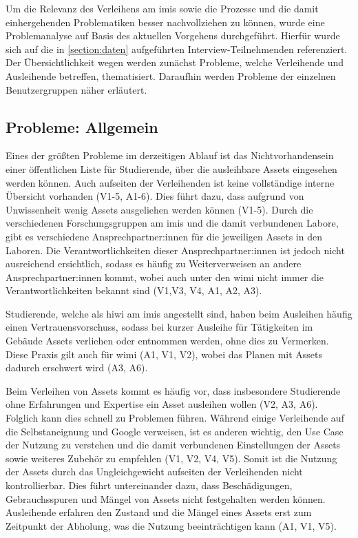 Um die Relevanz des Verleihens am \ac{imis} sowie die Prozesse und die damit einhergehenden
Problematiken besser nachvollziehen zu können, wurde eine Problemanalyse auf Basis des aktuellen
Vorgehens durchgeführt. Hierfür wurde sich auf die in \ref{section:daten} aufgeführten
Interview-Teilnehmenden referenziert. Der Übersichtlichkeit wegen werden zunächst Probleme,
welche Verleihende und Ausleihende betreffen, thematisiert. Daraufhin werden Probleme der einzelnen
Benutzergruppen näher erläutert.

\subsection{Probleme: Allgemein}
\label{section:probleme-allgemein}
Eines der größten Probleme im derzeitigen Ablauf ist das Nichtvorhandensein einer öffentlichen Liste
für Studierende, über die ausleihbare Assets eingesehen werden können. Auch aufseiten der
Verleihenden ist keine vollständige interne Übersicht vorhanden (V1-5, A1-6). Dies führt dazu, dass
aufgrund von Unwissenheit wenig Assets ausgeliehen werden können (V1-5). Durch die verschiedenen
Forschungsgruppen am \ac{imis} und die damit verbundenen Labore, gibt es verschiedene
Ansprechpartner:innen für die jeweiligen Assets in den Laboren. Die Verantwortlichkeiten dieser
Ansprechpartner:innen ist jedoch nicht ausreichend ersichtlich, sodass es häufig zu Weiterverweisen
an andere Ansprechpartner:innen kommt, wobei auch unter den \ac{wimi} nicht immer
die Verantwortlichkeiten bekannt sind (V1,V3, V4, A1, A2, A3).

Studierende, welche als \ac{hiwi} am \ac{imis} angestellt sind, haben beim Ausleihen häufig einen
Vertrauensvorschuss, sodass bei kurzer Ausleihe für Tätigkeiten im Gebäude Assets verliehen oder
entnommen werden, ohne dies zu Vermerken. Diese Praxis gilt auch für \ac{wimi} (A1, V1, V2), wobei
das Planen mit Assets dadurch erschwert wird (A3, A6).

Beim Verleihen von Assets kommt es häufig vor, dass insbesondere Studierende ohne Erfahrungen und
Expertise ein Asset ausleihen wollen (V2, A3, A6). Folglich kann dies schnell zu Problemen führen.
Während einige Verleihende auf die Selbstaneignung und Google verweisen, ist es anderen wichtig, den
Use Case der Nutzung zu verstehen und die damit verbundenen Einstellungen der Assets sowie weiteres
Zubehör zu empfehlen (V1, V2, V4, V5). Somit ist die Nutzung der Assets durch das Ungleichgewicht
aufseiten der Verleihenden nicht kontrollierbar. Dies führt untereinander dazu, dass Beschädigungen,
Gebrauchsspuren und Mängel von Assets nicht festgehalten werden können. Ausleihende erfahren den
Zustand und die Mängel eines Assets erst zum Zeitpunkt der Abholung, was die Nutzung beeinträchtigen
kann (A1, V1, V5).

